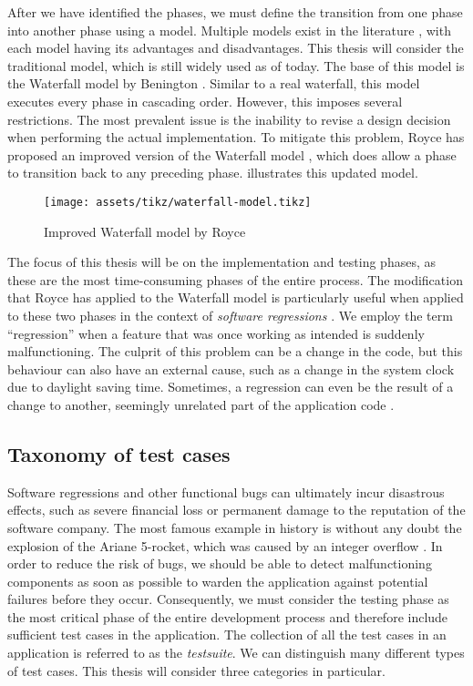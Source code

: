 \noindent After we have identified the phases, we must define the transition from one phase into another phase using a model. Multiple models exist in the literature \cite{2010govardhan}, with each model having its advantages and disadvantages. This thesis will consider the traditional model, which is still widely used as of today. The base of this model is the Waterfall model by Benington  \cite{united1956symposium}. Similar to a real waterfall, this model executes every phase in cascading order. However, this imposes several restrictions. The most prevalent issue is the inability to revise a design decision when performing the actual implementation. To mitigate this problem, Royce has proposed an improved version of the Waterfall model \cite{Royce:1987:MDL:41765.41801}, which does allow a phase to transition back to any preceding phase.  illustrates this updated model.\\

\begin{figure}[htbp!]
	\texttt{[image: assets/tikz/waterfall-model.tikz]}
	\caption{Improved Waterfall model by Royce}
	\label{fig:waterfall-royce}
\end{figure}

\noindent The focus of this thesis will be on the implementation and testing phases, as these are the most time-consuming phases of the entire process. The modification that Royce has applied to the Waterfall model is particularly useful when applied to these two phases in the context of \emph{software regressions} \cite{10.1007/978-3-540-77966-7_18}. We employ the term ``regression'' when a feature that was once working as intended is suddenly malfunctioning. The culprit of this problem can be a change in the code, but this behaviour can also have an external cause, such as a change in the system clock due to daylight saving time. Sometimes, a regression can even be the result of a change to another, seemingly unrelated part of the application code \cite{6588537}.

\subsection{Taxonomy of test cases}

Software regressions and other functional bugs can ultimately incur disastrous effects, such as severe financial loss or permanent damage to the reputation of the software company. The most famous example in history is without any doubt the explosion of the Ariane 5-rocket, which was caused by an integer overflow \cite{581900}. In order to reduce the risk of bugs, we should be able to detect malfunctioning components as soon as possible to warden the application against potential failures before they occur. Consequently, we must consider the testing phase as the most critical phase of the entire development process and therefore include sufficient test cases in the application. The collection of all the test cases in an application is referred to as the \emph{\gls{testsuite}}. We can distinguish many different types of test cases. This thesis will consider three categories in particular.

